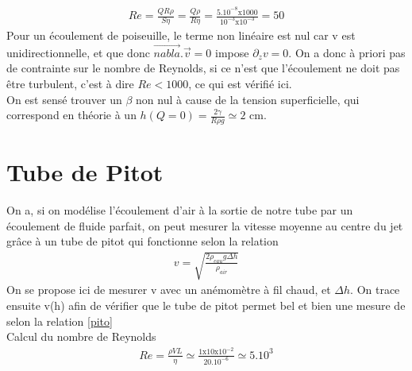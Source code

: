 \documentclass[12pt,prb,aps,epsf]{report}
\begin{document}
\begin{eqnarray}
Re = \frac{QR\rho}{S\eta} = \frac{Q\rho}{R\eta} = \frac{5.10^{-8}\mathrm{x}1000}{10^{-3}\mathrm{x}10^{-3}} = 50
\end{eqnarray}
Pour un écoulement de poiseuille, le terme non linéaire est nul car v est unidirectionnelle, et que donc $\vec{nabla}.\vec{v} = 0$ impose $\partial_z v=0$. On a donc à priori pas de contrainte sur le nombre de Reynolds, si ce n'est que l'écoulement ne doit pas être turbulent, c'est à dire $Re < 1000$, ce qui est vérifié ici.\\

On est sensé trouver un $\beta$ non nul à cause de la tension superficielle, qui correspond en théorie à un $h(Q=0) = \frac{2\gamma}{R\rho g}\simeq 2$ cm.

\section{Tube de Pitot}
On a, si on modélise l'écoulement d'air à la sortie de notre tube par un écoulement de fluide parfait, on peut mesurer la vitesse moyenne au centre du jet grâce à un tube de pitot qui fonctionne selon la relation
\begin{eqnarray}
v = \sqrt{\frac{2\rho_{eau}g\Delta h}{\rho_{air}}} \label{pito}
\end{eqnarray}
On se propose ici de mesurer v avec un anémomètre à fil chaud, et $\Delta h$. On trace ensuite v(h) afin de vérifier que le tube de pitot permet bel et bien une mesure de selon la relation \ref{pito}\\

Calcul du nombre de Reynolds 
\begin{eqnarray}
Re =\frac{\rho V L}{\eta}\simeq \frac{1\mathrm{x}10\mathrm{x}10^{-2}}{20.10^{-6}} \simeq 5.10^3
\end{eqnarray}
\end{document}
